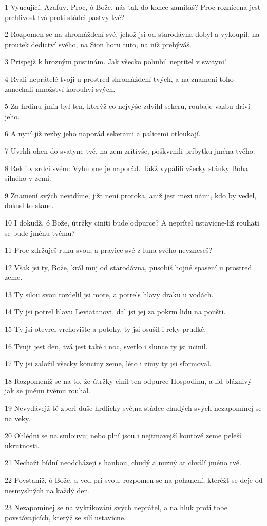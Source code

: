 \par 1 Vyucující, Azafuv. Proc, ó Bože, nás tak do konce zamítáš? Proc roznícena jest prchlivost tvá proti stádci pastvy tvé?
\par 2 Rozpomen se na shromáždení své, jehož jsi od starodávna dobyl a vykoupil, na proutek dedictví svého, na Sion horu tuto, na níž prebýváš.
\par 3 Prispejž k hrozným pustinám. Jak všecko pohubil neprítel v svatyni!
\par 4 Rvali neprátelé tvoji u prostred shromáždení tvých, a na znamení toho zanechali množství korouhví svých.
\par 5 Za hrdinu jmín byl ten, kterýž co nejvýše zdvihl sekeru, roubaje vazbu dríví jeho.
\par 6 A nyní již rezby jeho naporád sekerami a palicemi otloukají.
\par 7 Uvrhli ohen do svatyne tvé, na zem zrítivše, poškvrnili príbytku jména tvého.
\par 8 Rekli v srdci svém: Vyhubme je naporád. Takž vypálili všecky stánky Boha silného v zemi.
\par 9 Znamení svých nevidíme, jižt není proroka, aniž jest mezi námi, kdo by vedel, dokud to stane.
\par 10 I dokudž, ó Bože, útržky ciniti bude odpurce? A neprítel ustavicne-liž rouhati se bude jménu tvému?
\par 11 Proc zdržuješ ruku svou, a pravice své z luna svého nevzneseš?
\par 12 Však jsi ty, Bože, král muj od starodávna, pusobíš hojné spasení u prostred zeme.
\par 13 Ty silou svou rozdelil jsi more, a potrels hlavy draku u vodách.
\par 14 Ty jsi potrel hlavu Leviatanovi, dal jsi jej za pokrm lidu na poušti.
\par 15 Ty jsi otevrel vrchovište a potoky, ty jsi osušil i reky prudké.
\par 16 Tvujt jest den, tvá jest také i noc, svetlo i slunce ty jsi ucinil.
\par 17 Ty jsi založil všecky konciny zeme, léto i zimy ty jsi sformoval.
\par 18 Rozpomeniž se na to, že útržky cinil ten odpurce Hospodinu, a lid bláznivý jak se jménu tvému rouhal.
\par 19 Nevydávejž té zberi duše hrdlicky své,na stádce chudých svých nezapomínej se na veky.
\par 20 Ohlédni se na smlouvu; nebo plní jsou i nejtmavejší koutové zeme peleší ukrutnosti.
\par 21 Nechažt bídní neodcházejí s hanbou, chudý a nuzný at chválí jméno tvé.
\par 22 Povstaniž, ó Bože, a ved pri svou, rozpomen se na pohanení, kteréžt se deje od nesmyslných na každý den.
\par 23 Nezapomínej se na vykrikování svých neprátel, a na hluk proti tobe povstávajících, kterýž se silí ustavicne.

